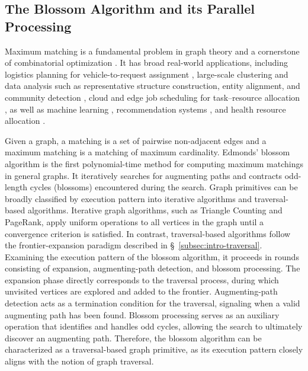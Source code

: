\subsection{The Blossom Algorithm and its Parallel Processing}
Maximum matching is a fundamental problem in graph theory and a cornerstone of combinatorial optimization \cite{plummer1986matching}.
It has broad real-world applications, including logistics planning for vehicle-to-request assignment \cite{meshkani2022generalized, abeywickrama2021optimizing, kalantari2023trailer}, large-scale clustering and data analysis such as representative structure construction, entity alignment, and community detection \cite{auer2012graph, dhillon2007weighted, zhu2024survey, sun2018bootstrapping, majmudar2020provable, rezaei2016set, gmati2024new}, cloud and edge job scheduling for task–resource allocation \cite{herodotou2021trident, yang2021edge, ye2024deep}, as well as machine learning \cite{he2021learnable, li2022sigma, wang2021joint}, recommendation systems \cite{han2021graph, naini2015you, su2021neural}, and health resource allocation \cite{roth2005pairwise}.

Given a graph, a matching is a set of pairwise non-adjacent edges and a maximum matching is a matching of maximum cardinality.
Edmonds’ blossom algorithm \cite{edmonds1965maximum, edmonds1965paths} is the first polynomial-time method for computing maximum matchings in general graphs.
It iteratively searches for augmenting paths and contracts odd-length cycles (blossoms) encountered during the search.
Graph primitives can be broadly classified by execution pattern into iterative algorithms and traversal-based algorithms.
Iterative graph algorithms, such as Triangle Counting and PageRank, apply uniform operations to all vertices in the graph until a convergence criterion is satisfied. 
In contrast, traversal-based algorithms follow the frontier-expansion paradigm described in \S~\ref{subsec:intro-traversal}.
Examining the execution pattern of the blossom algorithm, it proceeds in rounds consisting of expansion, augmenting-path detection, and blossom processing.
The expansion phase directly corresponds to the traversal process, during which unvisited vertices are explored and added to the frontier. 
Augmenting-path detection acts as a termination condition for the traversal, signaling when a valid augmenting path has been found. 
Blossom processing serves as an auxiliary operation that identifies and handles odd cycles, allowing the search to ultimately discover an augmenting path. 
Therefore, the blossom algorithm can be characterized as a traversal-based graph primitive, as its execution pattern closely aligns with the notion of graph traversal.

